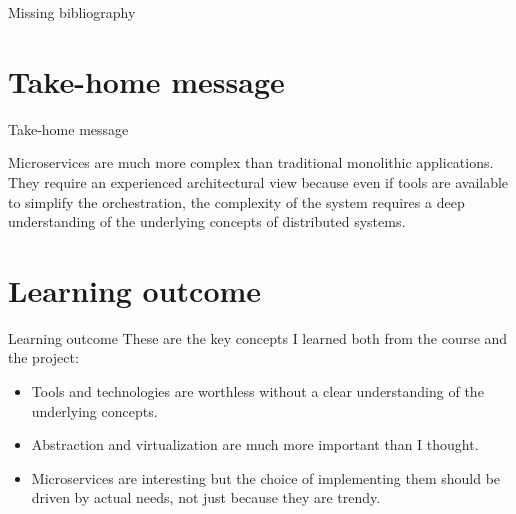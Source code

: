 \documentclass{beamer}
\begin{document}
\begin{frame}{Missing bibliography}

\end{frame}


\section{Take-home message}
\begin{frame}{Take-home message}
	\begin{block}{}
		Microservices are much more complex than traditional monolithic applications. They require an experienced architectural view because even if tools are available to simplify the orchestration, the complexity of the system requires a deep understanding of the underlying concepts of distributed systems.
	\end{block}
\end{frame}
\section{Learning outcome}
\begin{frame}{Learning outcome}
	These are the key concepts I learned both from the course and the project:
	\begin{itemize}
		\item Tools and technologies are worthless without a clear understanding of the underlying concepts.
		\item Abstraction and virtualization are much more important than I thought. %
		\item Microservices are interesting but the choice of implementing them should be driven by actual needs, not just because they are trendy.
	\end{itemize}
\end{frame}
\end{document}
